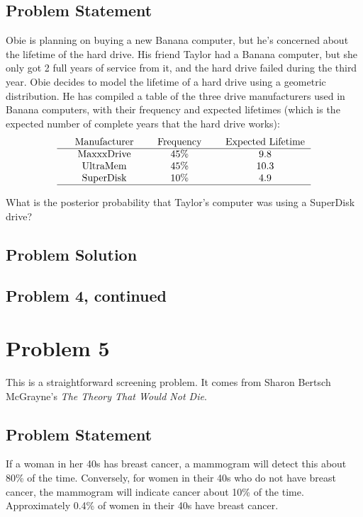 \documentclass[12pt]{article}
\theoremstyle{definition}
\begin{document}
\subsection*{Problem Statement}

Obie is planning on buying a new Banana computer, but he's concerned about the lifetime of the hard drive. His friend Taylor had a Banana computer, but she only got 2 full years of service from it, and the hard drive failed during the third year. Obie decides to model the lifetime of a hard drive using a geometric distribution. He has compiled a table of the three drive manufacturers used in Banana computers, with their frequency and expected lifetimes (which is the expected number of complete years that the hard drive works):
$$
\begin{tabular}{ccccccc}
& Manufacturer & & Frequency & & Expected Lifetime\\
\hline
& MaxxxDrive & & 45\% & & 9.8\\
& UltraMem & & 45\% & & 10.3\\
& SuperDisk & & 10\% & & 4.9\\
\hline
\end{tabular}
$$

\bigskip
What is the posterior probability that Taylor's computer was using a SuperDisk drive?


\subsection*{Problem Solution}

\newpage
\subsection*{Problem 4, continued}


\newpage
\section*{Problem 5}

This is a straightforward screening problem. It comes from Sharon Bertsch McGrayne's {\em The Theory That Would Not Die}.

\subsection*{Problem Statement}

If a woman in her 40s has breast cancer, a mammogram will detect this about 80\% of the time. Conversely, for women in their 40s who do not have breast cancer, the mammogram will indicate cancer about 10\% of the time. Approximately 0.4\% of women in their 40s have breast cancer.
\end{document}
